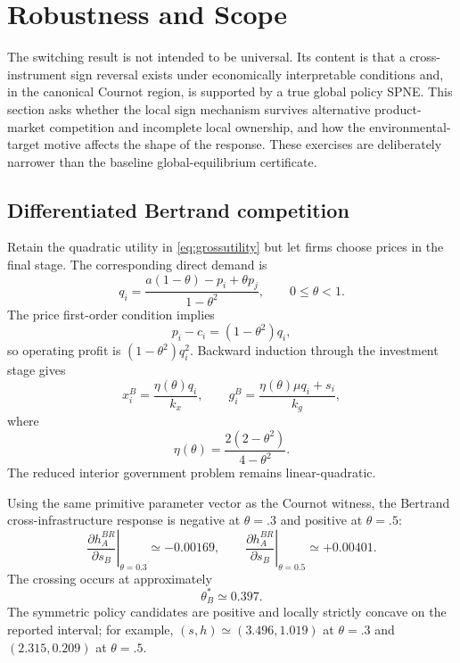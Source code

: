 \section{Robustness and Scope}
\label{sec:robustness}

The switching result is not intended to be universal. Its content is that a cross-instrument sign reversal exists under economically interpretable conditions and, in the canonical Cournot region, is supported by a true global policy SPNE. This section asks whether the local sign mechanism survives alternative product-market competition and incomplete local ownership, and how the environmental-target motive affects the shape of the response. These exercises are deliberately narrower than the baseline global-equilibrium certificate.

\subsection{Differentiated Bertrand competition}

Retain the quadratic utility in \eqref{eq:grossutility} but let firms choose prices in the final stage. The corresponding direct demand is
\begin{equation}
q_i
=\frac{a(1-\theta)-p_i+\theta p_j}{1-\theta^2},
\qquad 0\leq\theta<1.
\label{eq:bertrand-demand}
\end{equation}
The price first-order condition implies
\begin{equation}
p_i-c_i=(1-\theta^2)q_i,
\label{eq:bertrand-margin}
\end{equation}
so operating profit is $(1-\theta^2)q_i^2$. Backward induction through the investment stage gives
\begin{equation}
x_i^B=\frac{\eta(\theta)q_i}{k_x},
\qquad
g_i^B=\frac{\eta(\theta)\mu q_i+s_i}{k_g},
\end{equation}
where
\begin{equation}
\eta(\theta)=\frac{2(2-\theta^2)}{4-\theta^2}.
\end{equation}
The reduced interior government problem remains linear-quadratic.

Using the same primitive parameter vector as the Cournot witness, the Bertrand cross-infrastructure response is negative at $\theta=.3$ and positive at $\theta=.5$:
\[
\left.\frac{\partial h_A^{BR}}{\partial s_B}\right|_{\theta=0.3}
\simeq-0.00169,
\qquad
\left.\frac{\partial h_A^{BR}}{\partial s_B}\right|_{\theta=0.5}
\simeq+0.00401.
\]
The crossing occurs at approximately
\[
\theta_B^*\simeq0.397.
\]
The symmetric policy candidates are positive and locally strictly concave on the reported interval; for example, $(s,h)\simeq(3.496,1.019)$ at $\theta=.3$ and $(2.315,0.209)$ at $\theta=.5$.

